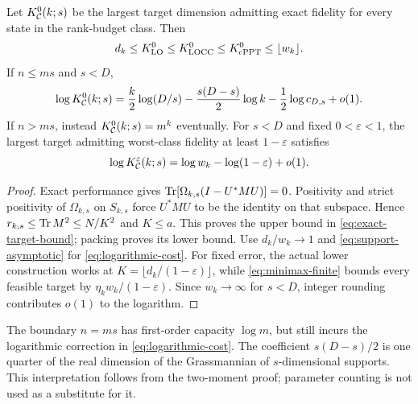 \begin{corollary}\label{cor:targets}
Let $K_{\mathcal C}^0(k;s)$ be the largest target dimension admitting exact fidelity for every state in the rank-budget class. Then
\begin{equation}\label{eq:exact-target-bound}
 d_k\le K_{\mathrm{LO}}^0\le K_{\mathrm{LOCC}}^0\le K_{\mathrm{cPPT}}^0\le\lfloor w_k\rfloor.
\end{equation}
If $n\le ms$ and $s<D$,
\begin{equation}\label{eq:logarithmic-cost}
 \log K_{\mathcal C}^0(k;s)
 =\frac k2\log(D/s)-\frac{s(D-s)}2\log k-\frac12\log c_{D,s}+o(1).
\end{equation}
If $n>ms$, instead $K_{\mathcal C}^0(k;s)=m^k$ eventually. For $s<D$ and fixed $0<\varepsilon<1$, the largest target admitting worst-class fidelity at least $1-\varepsilon$ satisfies
\begin{equation}\label{eq:fixed-error-minimax}
 \log K_{\mathcal C}^{\varepsilon}(k;s)
 =\log w_k-\log(1-\varepsilon)+o(1).
\end{equation}
\end{corollary}
\begin{proof}
Exact performance gives $\operatorname{Tr}[\Omega_{k,s}(I-U^*MU)]=0$. Positivity and strict positivity of $\Omega_{k,s}$ on $S_{k,s}$ force $U^*MU$ to be the identity on that subspace. Hence $r_{k,s}\le\operatorname{Tr} M^2\le N/K^2$ and $K\le a$. This proves the upper bound in \eqref{eq:exact-target-bound}; packing proves its lower bound. Use $d_k/w_k\to1$ and \eqref{eq:support-asymptotic} for \eqref{eq:logarithmic-cost}. For fixed error, the actual lower construction works at $K=\lfloor d_k/(1-\varepsilon)\rfloor$, while \eqref{eq:minimax-finite} bounds every feasible target by $\eta_kw_k/(1-\varepsilon)$. Since $w_k\to\infty$ for $s<D$, integer rounding contributes $o(1)$ to the logarithm.
\end{proof}

The boundary $n=ms$ has first-order capacity $\log m$, but still incurs the logarithmic correction in \eqref{eq:logarithmic-cost}. The coefficient $s(D-s)/2$ is one quarter of the real dimension of the Grassmannian of $s$-dimensional supports. This interpretation follows from the two-moment proof; parameter counting is not used as a substitute for it.

